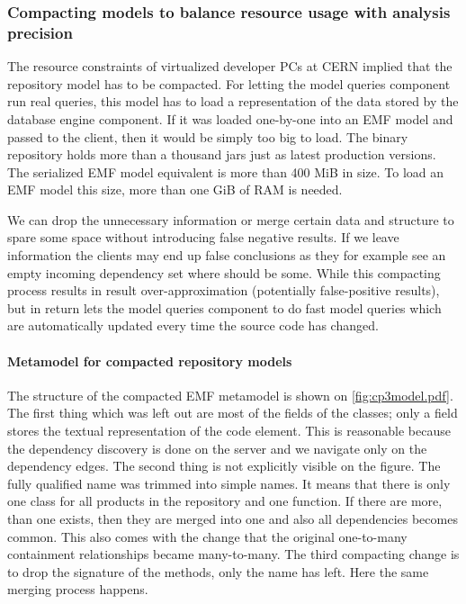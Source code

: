 \subsubsection{Compacting models to balance resource usage with analysis precision}
The resource constraints of virtualized developer PCs at CERN implied that the
repository model has to be compacted. 
For letting the model queries component run real queries, this model has to load
a representation of the data stored by the database engine component. If it was
loaded one-by-one into an EMF model and passed to the client, then it would be
simply too big to load. The binary repository holds more than a thousand jars
just as latest production versions. The serialized EMF model equivalent is more
than 400 MiB in size. To load an EMF model this size, more than one GiB of
RAM is needed.


We can drop the unnecessary information or
merge certain data and structure to spare some space without introducing false
negative results. If we leave information the clients may end up false
conclusions as they for example see an empty incoming dependency set where
should be some.
While this compacting process results in result over-approximation (potentially
false-positive results), but in return lets the model queries component to do
fast model queries which are automatically updated every time the source code
has changed.


\paragraph{Metamodel for compacted repository models}
The structure of the compacted EMF metamodel is shown on
\autoref{fig:cp3model.pdf}.
The first thing which was left out are most of the fields of the classes; only a
 field stores the textual representation of the code element. This is
reasonable because the dependency discovery is done on the server and we
navigate only on the dependency edges. The second thing is not explicitly
visible on the figure. The fully qualified name was trimmed into simple
names. It means that there is only one  class for all products in
the repository and one  function. If there are more, than one
exists, then they are merged into one and also all dependencies becomes common.
This also comes with the change that the original one-to-many containment
relationships became many-to-many. The third compacting change is to drop the
signature of the methods, only the name has left. Here the same merging process happens.

